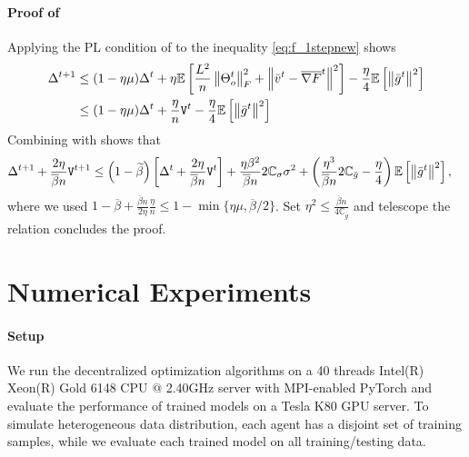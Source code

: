 \documentclass[10pt]{article} %
\theoremstyle{plain}
\theoremstyle{definition}
\theoremstyle{remark}
\newcommand{\aname}{{\tt DoCoM}}
\newcommand{\avgg}{\bar{g}}
\newcommand{\norm}[1]{\left\| #1 \right\|}
\newcommand{\ER}{{\tt V}}
\newcommand{\avggrdF}{\overline{\nabla F}}
\newcommand{\ConstS}{\mathbb{C}_\sigma}
\newcommand{\ConstG}{\mathbb{C}_{\avgg}}
\newcommand{\avgv}{\bar{v}}
\newcommand{\brho}{\overline{\beta}}
\newcommand{\bmu}{\widetilde{\beta}}
\begin{document}
\paragraph{Proof of } Applying the PL condition of  to the inequality \eqref{eq:f_1stepnew} shows \vspace{-.1cm}
\begin{align}
    \Delta^{t+1} & \leq (1 - \eta \mu) \Delta^t + \eta \mathbb{E} \left[ \frac{L^2}{n} \norm{\Theta_o^t}_F^2 + \norm{ \avgv^t - \avggrdF^t}^2  \right] - \frac{\eta}{4} \mathbb{E} \left[ \norm{\avgg^t}^2 \right] \notag \\
    & \leq (1 - \eta \mu) \Delta^t + \frac{\eta}{n} \ER^t - \frac{\eta}{4} \mathbb{E} \left[ \norm{\avgg^t}^2 \right]  
\end{align}
Combining with  shows that  \vspace{-.1cm}
\begin{align} 
     \Delta^{t+1} + \frac{2 \eta}{\brho n} \ER^{t+1} & \leq \left( 1 - \bmu \right) \left[ \Delta^t + \frac{2 \eta}{\brho n} \ER^t \right] + \frac{\eta \beta^2}{\brho n} 2 \ConstS \sigma^2 + \left( \frac{\eta^3}{\brho n} 2\ConstG  - \frac{\eta}{4} \right) \mathbb{E} \left[ \norm{\avgg^t}^2 \right],
\end{align}
where we used $1 - \brho + \frac{\brho n}{2 \eta} \frac{\eta}{n} \leq 1 - \min\{ \eta \mu, \brho / 2 \}$. 
Set $\eta^2 \leq \frac{\brho n}{4 \ConstG}$ and telescope the relation concludes the proof.%

\section{Numerical Experiments} 

\paragraph{Setup}
We run the decentralized optimization algorithms on a 40 threads Intel(R) Xeon(R) Gold 6148 CPU @ 2.40GHz server with MPI-enabled PyTorch and evaluate the performance of trained models on a Tesla K80 GPU server.
To simulate heterogeneous data distribution, each agent has a disjoint set of training samples, while we evaluate each trained model on all training/testing data. 
\end{document}

